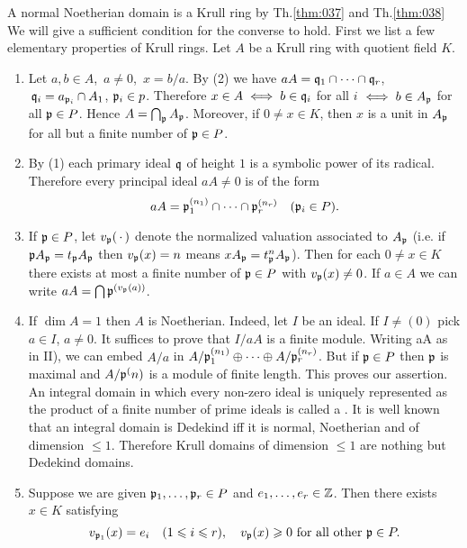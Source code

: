 \documentclass[../main]{subfiles}
\begin{document}
A normal Noetherian domain is a Krull ring by Th.\ref{thm:037} and Th.\ref{thm:038} We will give a sufficient condition for the converse to hold. First we list a few elementary properties of Krull rings. Let $A$ be a Krull ring with quotient field $K$.
\begin{enumerate}[label=\Roman*)]
    \item Let $a, b \in A$, $\, a \neq 0$, $\, x=b / a$. By (2) we have $aA =\mathfrak{q}_1 \cap \cdots \cap \mathfrak{q}_r$, $\,\mathfrak{q}_i=a_{\mathfrak{p}_i} \cap A_1$, $\mathfrak{p}_i \in p$. Therefore $x \in A\iff b \in \mathfrak{q}_i$ for all $i$ $\iff b \in A_{\mathfrak{p}}$ for all $\mathfrak{p} \in P$. Hence $A=\bigcap_{\mathfrak{p}} A_{\mathfrak{p}}$. Moreover, if $0 \neq x \in K$, then $x$ is a unit in $A_{\mathfrak{p}}$ for all but a finite number of $\mathfrak{p} \in P$.
    \item By (1) each primary ideal $\mathfrak{q}$ of height $1$ is a symbolic power of its radical. Therefore every principal ideal $aA \neq 0$ is of the form \[a A=\ideal p_1^{(n_1)} \cap \cdots \cap \ideal p_r^{(n_r)}\for{\ideal p_i \in P}.\]
    \item If $\mathfrak{p} \in P$, let $v_{\mathfrak{p}}(\,\cdot\,)$ denote the normalized valuation associated to $A_{\mathfrak{p}}$ (i.e. if $\mathfrak{p} A_{\mathfrak{p}}=t_{\mathfrak{p}} A_{\mathfrak{p}}$ then $v_{\mathfrak{p}}(x)=n$ means $xA_{\mathfrak{p}}=t_{\mathfrak{p}}^nA_{\mathfrak{p}}$). Then for each $0 \neq x \in K$ there exists at most a finite number of $\mathfrak{p} \in P$ with $v_{\mathfrak{p}}(x) \neq 0$. If $a \in A$ we can write $aA=\bigcap {\mathfrak{p}}^{(v_{\mathfrak{p}}(a))}$.
    \item If $\dim A=1$ then $A$ is Noetherian. Indeed, let $I$ be an ideal. If $I \neq(0)$ pick $a \in I$, $a \neq 0$. It suffices to prove that $I/aA$ is a finite module. Writing aA as in II), we can embed $A/a$ in $A/\mathfrak{p}_1^{(n_1)}\oplus\cdots\oplus A/\mathfrak{p}_r^{(n_r)}$. But if $\mathfrak{p} \in P$ then $\mathfrak{p}$ is maximal and $A / \mathfrak{p}^(n)$ is a module of finite length. This proves our assertion. An integral domain in which every non-zero ideal is uniquely represented as the product of a finite number of prime ideals is called a . It is well known that an integral domain is Dedekind iff it is normal, Noetherian and of dimension $\leqslant 1$. Therefore Krull domains of dimension $\leqslant 1$ are nothing but Dedekind domains.
    \item Suppose we are given $\mathfrak{p}_1, \dots, \mathfrak{p}_r \in P$ and $e_1, \dots, e_r \in \mathbb{Z}$. Then there exists $x \in K$ satisfying \[v_{\mathfrak{p}_1}(x)=e_i\quad(1 \leqslant i \leqslant r), \quad v_{\mathfrak{p}}(x) \geqslant 0\text{ for all other }\mathfrak{p} \in P.\]
\end{enumerate}
\end{document}
